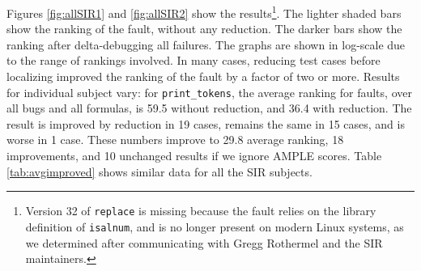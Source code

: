 Figures \ref{fig:allSIR1} and \ref{fig:allSIR2} show the
results\footnote{Version 32 of {\tt replace} is missing because the
fault relies on the library definition of {\tt isalnum}, and is no
longer present on modern Linux systems, as we determined after
communicating with Gregg Rothermel and the SIR maintainers.}.  The
lighter shaded bars show the ranking of the fault, without any
reduction.  The darker bars show the ranking after delta-debugging all
failures.  The graphs are shown in log-scale due to the range of
rankings involved.  In many cases, reducing test cases before
localizing improved the ranking of the fault by a factor of two or
more.  Results for individual subject vary: for {\tt print\_tokens},
the average ranking for faults, over all bugs and all formulas, is
59.5 without reduction, and 36.4 with reduction.  The result is
improved by reduction in 19 cases, remains the same in 15 cases, and
is worse in 1 case.  These numbers improve to 29.8 average ranking, 18
improvements, and 10 unchanged results if we ignore AMPLE scores.
Table \ref{tab:avgimproved} shows similar data for all the SIR
subjects.  

